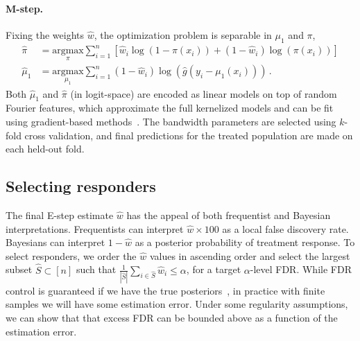 \paragraph{M-step.} Fixing the weights $\hat{w}$, the optimization problem is separable in $\mu_1$ and $\pi$,
\begin{equation*}
\label{eqn:additive_m_step}
\begin{aligned}
\hat{\pi} &= \underset{\pi}{\text{argmax}} \sum_{i=1}^n \left[ \hat{w}_i \log(1-\pi(x_i)) + (1-\hat{w}_i) \log(\pi(x_i)) \right] \\
\hat{\mu}_1 &= \underset{\mu_1}{\text{argmax}} \sum_{i=1}^n (1-\hat{w}_i) \log(\hat{g}(y_i - \mu_1(x_i))) \, .
\end{aligned}
\end{equation*}
Both $\hat{\mu}_1$ and $\hat{\pi}$ (in logit-space) are encoded as linear models on top of random Fourier features, which approximate the full kernelized models and can be fit using gradient-based methods~\citep{rahimi:recht:2007:random-fourier-features}. The bandwidth parameters are selected using $k$-fold cross validation, and final predictions for the treated population are made on each held-out fold.

\subsection{Selecting responders}
\label{subsec:method:selection}
The final E-step estimate $\hat{w}$ has the appeal of both frequentist and Bayesian interpretations. Frequentists can interpret $\hat{w}\times 100$ as a local false discovery rate. Bayesians can interpret $1-\hat{w}$ as a posterior probability of treatment response. To select responders, we order the $\hat{w}$ values in ascending order and select the largest subset $\hat{S} \subset [n]$ such that $\frac{1}{|\hat{S}|} \sum_{i \in \hat{S}} \hat{w}_i \leq \alpha$, for a target $\alpha$-level FDR. While FDR control is guaranteed if we have the true posteriors~\citep{efron2012}, in practice with finite samples we will have some estimation error. Under some regularity assumptions, we can show that that excess FDR can be bounded above as a function of the estimation error.

